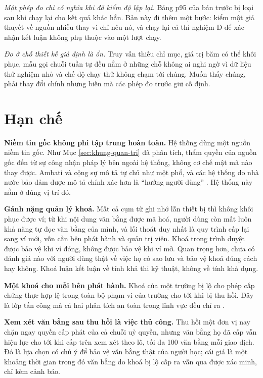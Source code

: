 \textit{Một phép đo chỉ có nghĩa khi đã kiểm độ lặp lại.} Bảng p95 của bản trước bị loại sau khi chạy lại cho kết quả khác hẳn. Bản này đi thêm một bước: kiểm một giả thuyết về nguồn nhiễu thay vì chỉ nêu nó, và chạy lại cả thí nghiệm D để xác nhận kết luận không phụ thuộc vào một lượt chạy.

\textit{Đo ở chỗ thiết kế giả định là ổn.} Truy vấn thiếu chỉ mục, giá trị băm có thể khôi phục, mẫu gọi chuỗi tuần tự đều nằm ở những chỗ không ai nghi ngờ vì dữ liệu thử nghiệm nhỏ và chế độ chạy thử không chạm tới chúng. Muốn thấy chúng, phải thay đổi chính những biến mà các phép đo trước giữ cố định.

\section{Hạn chế}
\label{sec:han-che}

\textbf{Niềm tin gốc không phi tập trung hoàn toàn.} Hệ thống dùng một nguồn niềm tin gốc. Như Mục \ref{sec:khung-quan-tri} đã phân tích, thẩm quyền của nguồn gốc đến từ sự công nhận pháp lý bên ngoài hệ thống, không cơ chế mật mã nào thay được. Ambati và cộng sự mô tả tự chủ như một phổ, và các hệ thống do nhà nước bảo đảm được mô tả chính xác hơn là ``hướng người dùng'' \cite{Ambati2026}. Hệ thống này nằm ở đúng vị trí đó.

\textbf{Gánh nặng quản lý khoá.} Mất cả cụm từ ghi nhớ lẫn thiết bị thì không khôi phục được ví; từ khi nội dung văn bằng được mã hoá, người dùng còn mất luôn khả năng tự đọc văn bằng của mình, và lối thoát duy nhất là quy trình cấp lại sang ví mới, vốn cần bên phát hành và quản trị viên. Khoá trong trình duyệt được bảo vệ khi ví đóng, không được bảo vệ khi ví mở. Quan trọng hơn, chưa có đánh giá nào với người dùng thật về việc họ có sao lưu và bảo vệ khoá đúng cách hay không. Khoá luận kết luận về tính khả thi kỹ thuật, không về tính khả dụng.

\textbf{Một khoá cho mỗi bên phát hành.} Khoá của một trường bị lộ cho phép cấp chứng thực hợp lệ trong toàn bộ phạm vi của trường cho tới khi bị thu hồi. Đây là lớp tấn công mà cả hai phân tích an toàn trong lĩnh vực đều chỉ ra \cite{Baldi2019, Zonneveld2026}.

\textbf{Xem xét văn bằng sau thu hồi là việc thủ công.} Thu hồi một đơn vị nay chặn ngay quyền cấp phát của cả chuỗi uỷ quyền, nhưng văn bằng họ đã cấp vẫn hiệu lực cho tới khi cấp trên xem xét theo lô, tối đa 100 văn bằng mỗi giao dịch. Đó là lựa chọn có chủ ý để bảo vệ văn bằng thật của người học; cái giá là một khoảng thời gian trong đó văn bằng do khoá bị lộ cấp ra vẫn qua được xác minh, chỉ kèm cảnh báo.

